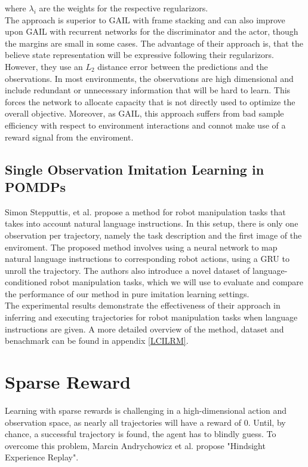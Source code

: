 where $\lambda_i$ are the weights for the respective regularizors. \\
The approach is superior to GAIL with frame stacking and can also improve upon GAIL with recurrent networks for the discriminator and the actor, though the margins are small in some cases. The advantage 
of their approach is, that the believe state representation will be expressive following their regularizors. However, they use an $L_2$ distance error between the predictions and the observations. In most environments, 
the observations are high dimensional and include redundant or unnecessary information that will be hard to learn. This forces the network to allocate capacity that is not directly used to 
optimize the overall objective. Moreover, as GAIL, this approach suffers from bad sample efficiency with respect to environment interactions and connot make use of a reward signal from the enviroment. 

\subsection{Single Observation Imitation Learning in POMDPs}
Simon Stepputtis, et al. \cite{stepputtis2020languageconditioned} propose a method for robot manipulation tasks that takes 
into account natural language instructions. 
In this setup, there is only one observation per trajectory, namely the task description and the first image of the enviroment.
The proposed method involves using a neural network to map natural language instructions to 
corresponding robot actions, using a GRU to unroll the trajectory. The authors also introduce a novel dataset of language-conditioned robot manipulation tasks, which we will use to evaluate 
and compare the performance of our method in pure imitation learning settings.\\ 
The experimental results demonstrate the effectiveness of their approach in inferring and executing trajectories for robot manipulation 
tasks when language instructions are given. A more detailed overview of the method, dataset and benachmark can be found in appendix \ref{LCILRM}.\\

\section{Sparse Reward}
\label{sec:HER}
Learning with sparse rewards is challenging in a high-dimensional action and observation space, as nearly all trajectories will have a reward of 0.
Until, by chance, a successful trajectory is found, the agent has to blindly guess. To overcome this problem, Marcin Andrychowicz et al. \cite{andrychowicz2018hindsight} 
propose "Hindsight Experience Replay".\\

